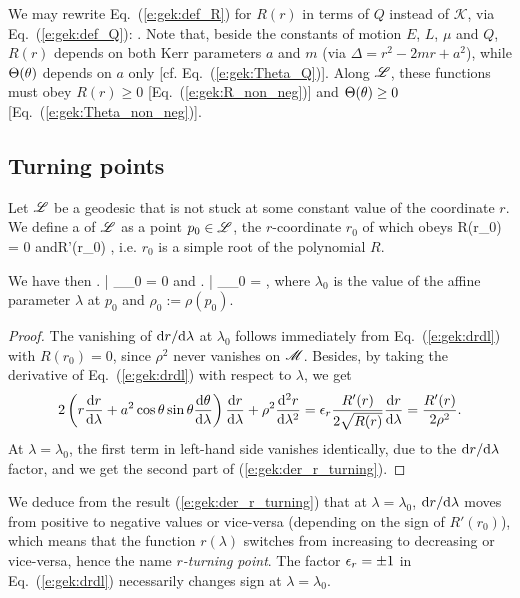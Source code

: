 We may rewrite Eq.~(\ref{e:gek:def_R}) for $R(r)$ in terms of $Q$
instead of $\mathscr{K}$, via Eq.~(\ref{e:gek:def_Q}):
\be \label{e:gek:def_R_Q}
   .
\ee
Note that, beside the constants of motion $E$, $L$, $\mu$ and $Q$, $R(r)$ depends on both Kerr parameters $a$ and $m$
(via $\Delta = r^2 - 2 m r + a^2$), while $\Theta(\theta)$
depends on $a$ only [cf. Eq.~(\ref{e:gek:Theta_Q})].
Along $\mathscr{L}$, these functions must obey
$R(r) \geq 0$ [Eq.~(\ref{e:gek:R_non_neg})] and $\Theta(\theta) \geq 0$
[Eq.~(\ref{e:gek:Theta_non_neg})].


\subsection{Turning points} \label{s:gek:turning_points}

Let $\mathscr{L}$ be a geodesic that is not stuck at some constant value of the
coordinate $r$.
We define a  of $\mathscr{L}$ as a point $p_0\in\mathscr{L}$, the $r$-coordinate $r_0$ of which obeys
\be \label{e:gek:def_r_turning}
    R(r_0) = 0 \quad\mbox{and}\quad R'(r_0)  ,
\ee
i.e. $r_0$ is a simple root of the polynomial $R$.

We have then
\be \label{e:gek:der_r_turning}
   \left.  \right| _{\lambda_0} = 0
   \quad\mbox{and}\quad
   \left.  \right| _{\lambda_0} =   ,
\ee
where $\lambda_0$ is the value of the affine parameter $\lambda$ at $p_0$
and $\rho_0 := \rho(p_0)$.
\begin{proof}
The vanishing of $\mathrm{d} r/\mathrm{d}\lambda$ at $\lambda_0$ follows immediately
from Eq.~(\ref{e:gek:drdl}) with $R(r_0)=0$, since $\rho^2$ never vanishes
on $\mathscr{M}$. Besides, by
taking the derivative of Eq.~(\ref{e:gek:drdl}) with respect to $\lambda$, we
get
\[
    2 \left(r \frac{\mathrm{d} r}{\mathrm{d} \lambda} + a^2 \cos\theta\sin\theta \frac{\mathrm{d} \theta}{\mathrm{d} \lambda} \right)
    \frac{\mathrm{d} r}{\mathrm{d} \lambda} + \rho^2 \frac{\mathrm{d}^2 r}{\mathrm{d}\lambda^2} =
    \epsilon_r \frac{R'(r)}{2\sqrt{R(r)}} \frac{\mathrm{d} r}{\mathrm{d} \lambda} = \frac{R'(r)}{2\rho^2} .
\]
At $\lambda=\lambda_0$, the first term in left-hand side vanishes identically,
due to the $\mathrm{d} r/\mathrm{d}\lambda$ factor,
and we get the second part of (\ref{e:gek:der_r_turning}).
\end{proof}

We deduce from the result (\ref{e:gek:der_r_turning}) that at $\lambda=\lambda_0$,
$\mathrm{d} r/\mathrm{d}\lambda$ moves from positive to negative values or vice-versa
(depending on the sign of $R'(r_0)$), which means that the function $r(\lambda)$
switches from increasing to decreasing or vice-versa, hence the name
\emph{$r$-turning point}. The factor $\epsilon_r=\pm 1$ in Eq.~(\ref{e:gek:drdl}) necessarily
changes sign at $\lambda=\lambda_0$.


